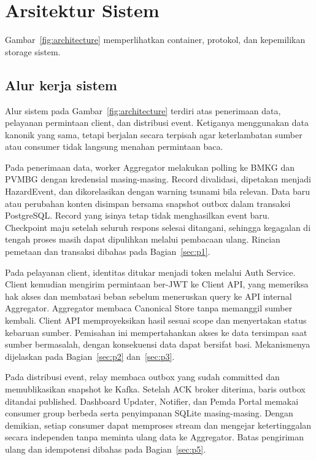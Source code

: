 \clearpage
\section{Arsitektur Sistem}
\label{sec:architecture}
Gambar~\ref{fig:architecture} memperlihatkan container, protokol, dan kepemilikan storage sistem.
\architecturefigure

\subsection{Alur kerja sistem}
Alur sistem pada Gambar~\ref{fig:architecture} terdiri atas penerimaan data, pelayanan permintaan client, dan distribusi event. Ketiganya menggunakan data kanonik yang sama, tetapi berjalan secara terpisah agar keterlambatan sumber atau consumer tidak langsung menahan permintaan baca.

Pada penerimaan data, worker Aggregator melakukan polling ke BMKG dan PVMBG dengan kredensial masing-masing. Record divalidasi, dipetakan menjadi HazardEvent, dan dikorelasikan dengan warning tsunami bila relevan. Data baru atau perubahan konten disimpan bersama snapshot outbox dalam transaksi PostgreSQL. Record yang isinya tetap tidak menghasilkan event baru. Checkpoint maju setelah seluruh respons selesai ditangani, sehingga kegagalan di tengah proses masih dapat dipulihkan melalui pembacaan ulang. Rincian pemetaan dan transaksi dibahas pada Bagian~\ref{sec:p1}.

Pada pelayanan client, identitas ditukar menjadi token melalui Auth Service. Client kemudian mengirim permintaan ber-JWT ke Client API, yang memeriksa hak akses dan membatasi beban sebelum meneruskan query ke API internal Aggregator. Aggregator membaca Canonical Store tanpa memanggil sumber kembali. Client API memproyeksikan hasil sesuai scope dan menyertakan status kebaruan sumber. Pemisahan ini mempertahankan akses ke data tersimpan saat sumber bermasalah, dengan konsekuensi data dapat bersifat basi. Mekanismenya dijelaskan pada Bagian~\ref{sec:p2} dan~\ref{sec:p3}.

Pada distribusi event, relay membaca outbox yang sudah committed dan memublikasikan snapshot ke Kafka. Setelah ACK broker diterima, baris outbox ditandai published. Dashboard Updater, Notifier, dan Pemda Portal memakai consumer group berbeda serta penyimpanan SQLite masing-masing. Dengan demikian, setiap consumer dapat memproses stream dan mengejar ketertinggalan secara independen tanpa meminta ulang data ke Aggregator. Batas pengiriman ulang dan idempotensi dibahas pada Bagian~\ref{sec:p5}.

